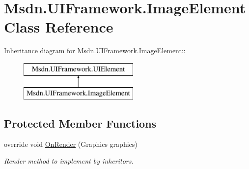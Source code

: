 \hypertarget{class_msdn_1_1_u_i_framework_1_1_image_element}{
\section{Msdn.UIFramework.ImageElement Class Reference}
\label{class_msdn_1_1_u_i_framework_1_1_image_element}
}
Inheritance diagram for Msdn.UIFramework.ImageElement::\begin{figure}[H]
\begin{center}
\leavevmode
\includegraphics[height=2cm]{class_msdn_1_1_u_i_framework_1_1_image_element}
\end{center}
\end{figure}
\subsection*{Protected Member Functions}
\begin{DoxyCompactItemize}
\item 
override void \hyperlink{class_msdn_1_1_u_i_framework_1_1_image_element_acf50352e5c1e7d09d308d32362fda263}{OnRender} (Graphics graphics)
\begin{DoxyCompactList}\small\item\em Render method to implement by inheritors. \item\end{DoxyCompactList}\end{DoxyCompactItemize}
